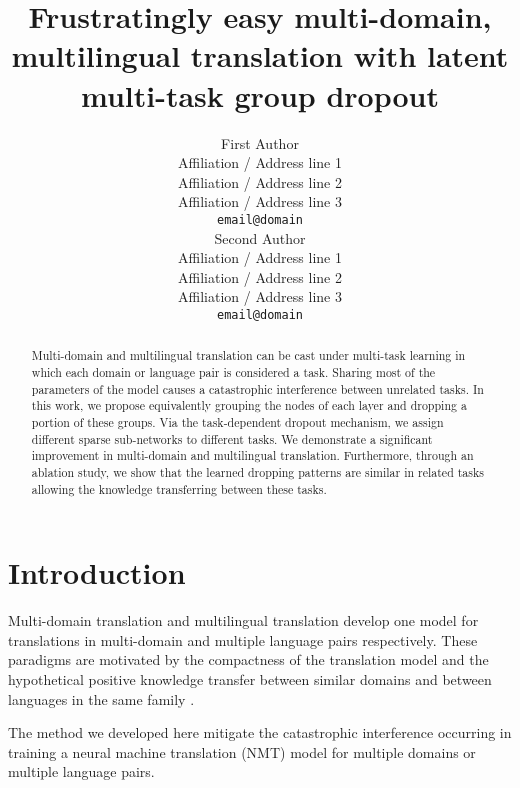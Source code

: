 \documentclass[11pt]{article}
\title{Frustratingly easy multi-domain, multilingual translation with latent multi-task group dropout}
\author{First Author \\
  Affiliation / Address line 1 \\
  Affiliation / Address line 2 \\
  Affiliation / Address line 3 \\
  \texttt{email@domain} \\\And
  Second Author \\
  Affiliation / Address line 1 \\
  Affiliation / Address line 2 \\
  Affiliation / Address line 3 \\
  \texttt{email@domain} \\}
\begin{document}
\maketitle
\begin{abstract}
Multi-domain and multilingual translation can be cast under multi-task learning in which each domain or language pair is considered a task. Sharing most of the parameters of the model causes a catastrophic interference between unrelated tasks. In this work, we propose equivalently grouping the nodes of each layer and dropping a portion of these groups. Via the task-dependent dropout mechanism, we assign different sparse sub-networks to different tasks. We demonstrate a significant improvement in multi-domain and multilingual translation. Furthermore, through an ablation study, we show that the learned dropping patterns are similar in related tasks allowing the knowledge transferring between these tasks.

\end{abstract}

\section{Introduction}
Multi-domain translation and multilingual translation develop one model for translations in multi-domain and multiple language pairs respectively. These paradigms are motivated by the compactness of the translation model and the hypothetical positive knowledge transfer between similar domains \citep{Pham21revisiting} and between languages in the same family \citep{Tan19multilingual}. 

The method we developed here mitigate the catastrophic interference occurring in training a neural machine translation (NMT) model for multiple domains or multiple language pairs. 
\end{document}
